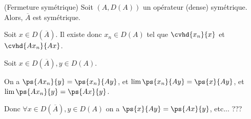 \begin{thm}
    (Fermeture symétrique)
    Soit $(A, D(A))$ un opérateur (dense) symétrique.
    Alors, $\overline A$ est symétrique.

%
%

    Soit $x \in D(\overline A)$. Il existe donc $x_n \in D(A)$ tel que
    $\cvhd{x_n}{x}$ et $\cvhd{Ax_n}{Ax}$.

    Soit $x \in D(\overline A), y \in D(A)$.



    On a $\ps{Ax_n}{y} = \ps{x_n}{Ay}$,
    et $\lim \ps{x_n}{Ay} = \ps{x}{Ay}$,
    et $\lim \ps{Ax_n}{y} = \ps{Ax}{y}$.

    Donc $\forall x \in D(\overline A), y \in D(A)$ on a
    $\ps{x}{Ay} = \ps{Ax}{y}$, etc... ???


\end{thm}




%
%
%
%
%
%
%
%
%
%


